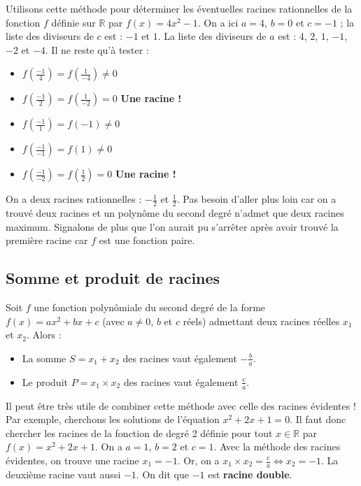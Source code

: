 	\begin{tip}[Exemple]
		Utilisons cette méthode pour déterminer les éventuelles racines rationnelles de la fonction $f$ définie sur $\mathbb{R}$ par $f(x) = 4x^2 - 1$.
		\newpar
		On a ici $a = 4$, $b = 0$ et $c = -1$ ; la liste des diviseurs de $c$ est : $-1$ et $1$.
		\newline
		La liste des diviseurs de $a$ est : $4$, $2$, $1$, $-1$, $-2$ et $-4$.
		Il ne reste qu'à tester :
		\begin{itemize}
			\item $f\left(\frac{-1}{4}\right)=f\left(\frac{1}{-4}\right) \neq 0$
			\item $f\left(\frac{-1}{2}\right)=f\left(\frac{1}{-2}\right)=0$ \textbf{Une racine !}
			\item $f\left(\frac{-1}{1}\right)=f(-1) \neq 0$
			\item $f\left(\frac{-1}{-1}\right)=f(1) \neq 0$
			\item $f\left(\frac{-1}{-2}\right)=f\left(\frac{1}{2}\right)=0$ \textbf{Une racine !}
		\end{itemize}
		On a deux racines rationnelles : $-\frac{1}{2}$ et $\frac{1}{2}$.
		\newpar
		Pas besoin d'aller plus loin car on a trouvé deux racines et un polynôme du second degré n'admet que deux racines maximum.
		\newpar
		Signalons de plus que l'on aurait pu s'arrêter après avoir trouvé la première racine car $f$ est une fonction paire.
	\end{tip}

	\subsection{Somme et produit de racines}

	\begin{formula}[Relations]
		Soit $f$ une fonction polynômiale du second degré de la forme $f(x) = ax^2 + bx +c$ (avec $a \neq 0$, $b$ et $c$ réels) admettant deux racines réelles $x_1$ et $x_2$. Alors :
		\begin{itemize}
			\item La somme $S = x_1 + x_2$ des racines vaut également $-\frac{b}{a}$.
			\item Le produit $P = x_1 \times x_2$ des racines vaut également $\frac{c}{a}$.
		\end{itemize}
	\end{formula}

	\begin{tip}[Exemple]
		Il peut être très utile de combiner cette méthode avec celle des racines évidentes !
		Par exemple, cherchons les solutions de l'équation $x^2 + 2x + 1 = 0$.
		\newpar
		Il faut donc chercher les racines de la fonction de degré 2 définie pour tout $x \in \mathbb{R}$ par $f(x) = x^2 + 2x + 1$.
		\newpar
		On a $a = 1$, $b = 2$ et $c = 1$. Avec la méthode des racines évidentes, on trouve une racine $x_1 = -1$.
		\newpar
		Or, on a $x_1 \times x_2 = \frac{c}{a} \iff x_2 = -1$. La deuxième racine vaut aussi $-1$.
		\newpar
		On dit que $-1$ est \textbf{racine double}.
	\end{tip}

